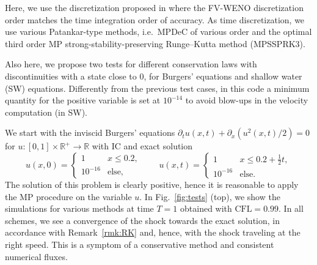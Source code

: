 \documentclass[final,11pt, times, linenumber, nopreprintline]{elsarticle}
\begin{document}
Here, we use the discretization proposed in \cite{ciallella2022arbitrary} where the FV-WENO discretization order matches the time integration order of accuracy.
As time discretization, we use various Patankar-type methods, i.e.\ MPDeC \cite{offner2020arbitrary} of various order and the optimal third order MP strong-stability-preserving Runge--Kutta method \cite{huang2019third} (MPSSPRK3). 


Also here, we propose two tests for different conservation laws with discontinuities with a state close to 0, for Burgers' equations and shallow water (SW) equations. Differently from the previous test cases, in this code a minimum quantity for the positive variable is set at $10^{-14}$ to avoid blow-ups in the velocity computation (in SW). 

We start with the inviscid Burgers' equations $\partial_t u(x,t) +\partial_x (u^2(x,t)/2) =0$ for $u:[0,1]\times \mathbb R^+\to \mathbb R$  with IC and exact solution
\begin{equation*}
	u(x,0)=\begin{cases}
		1& x\leq 0.2,\\
		10^{-16}&\text{else,}
	\end{cases}\qquad 
	u(x,t) = \begin{cases}
		1& x\leq 0.2+\frac12 t,\\
		10^{-16}& \text{else}.
	\end{cases}
\end{equation*}
The solution of this problem is clearly positive, hence it is reasonable to apply the MP procedure on the variable $u$. In Fig.~\ref{fig:tests} (top), we show the simulations for various methods at time $T=1$ obtained with $\text{CFL}=0.99$. In all schemes, we see a convergence of the shock towards the exact solution, in accordance with Remark~\ref{rmk:RK} and, hence, with the shock traveling at the right speed. This is a symptom of a conservative method and consistent numerical fluxes.
\end{document}

